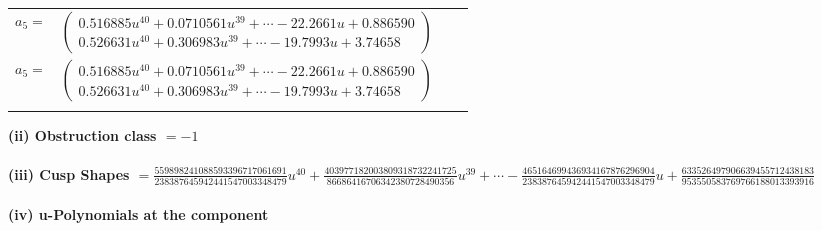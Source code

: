 \documentclass[1p]{elsarticle_modified}
\theoremstyle{definition}
\begin{document}
\begin{tabular}{m{7pt} m{180pt} m{7pt} m{180pt} }
\flushright $a_{5}=$&$\begin{pmatrix}0.516885 u^{40}+0.0710561 u^{39}+\cdots-22.2661 u+0.886590\\0.526631 u^{40}+0.306983 u^{39}+\cdots-19.7993 u+3.74658\end{pmatrix}$\\ \flushright $a_{5}=$&$\begin{pmatrix}0.516885 u^{40}+0.0710561 u^{39}+\cdots-22.2661 u+0.886590\\0.526631 u^{40}+0.306983 u^{39}+\cdots-19.7993 u+3.74658\end{pmatrix}$\\&\end{tabular}
\flushleft \textbf{(ii) Obstruction class $= -1$}\\~\\
\flushleft \textbf{(iii) Cusp Shapes $= \frac{559898241088593396717061691}{238387645942441547003348479} u^{40}+\frac{403977182003809318732241725}{86686416706342380728490356} u^{39}+\cdots-\frac{465164699436934167876296904}{238387645942441547003348479} u+\frac{633526497906639455712438183}{953550583769766188013393916}$}\\~\\
\newpage\renewcommand{\arraystretch}{1}
\flushleft \textbf{(iv) u-Polynomials at the component}\newline \\
\end{document}
